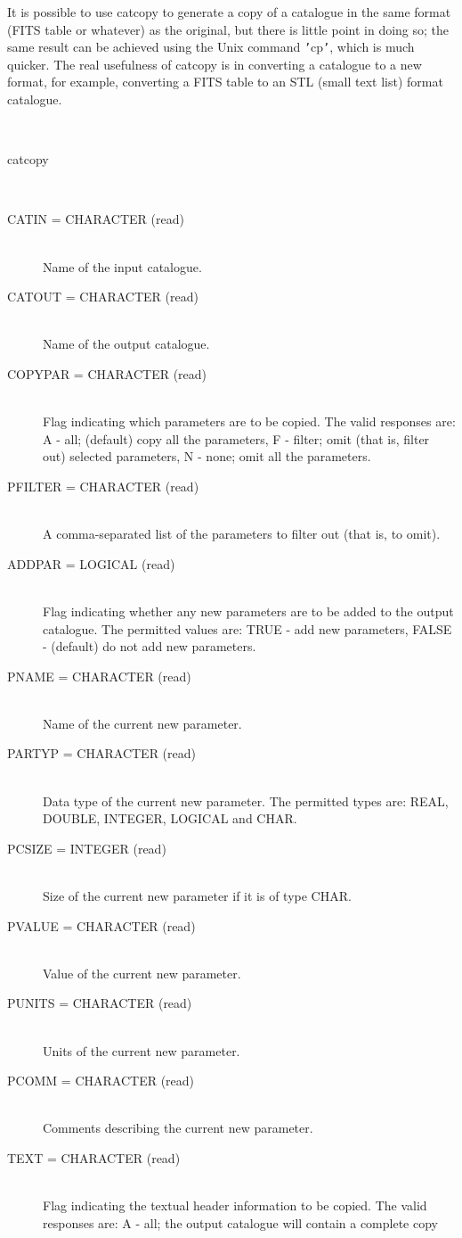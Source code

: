 \documentclass[twoside,11pt]{article}
\renewcommand{\_}{\texttt{\symbol{95}}}
\newcommand{\sstusage}[1]{\item[Usage:] \mbox{}
\\[1.3ex]{\raggedright \ssttt #1}}
\newcommand{\sstparameters}[1]{
   \item[Parameters:] \mbox{} \\
   \vspace{-3.5ex}
   \begin{description}
      #1
   \end{description}
}
\newcommand{\sstsubsection}[1]{ \item[{#1}] \mbox{} \\}
\newcommand{\sstusage}[1]{\item[Usage:]
      \begin{description}
         {\ssttt #1}
      \end{description}
      \\
   }
\newcommand{\sstparameters}[1]{
      \item[Parameters:] \\
      \begin{description}
         #1
      \end{description}
      \\
   }
\newcommand{\sstsubsection}[1]{\item[{#1}]}
\begin{document}
\begin{htmlonly}
{{      It is possible to use catcopy to generate a copy of a catalogue
      in the same format (FITS table or whatever) as the original, but
      there is little point in doing so; the same result can be achieved
      using the Unix command {\tt '}cp{\tt '}, which is much quicker. The real
      usefulness of catcopy is in converting a catalogue to a new format,
      for example, converting a FITS table to an STL (small text list)
      format catalogue.
   }
   \sstusage{
      catcopy
   }
   \sstparameters{
      \sstsubsection{
         CATIN  =  CHARACTER (read)
      }{
         Name of the input catalogue.
      }
      \sstsubsection{
         CATOUT  =  CHARACTER (read)
      }{
         Name of the output catalogue.
      }
      \sstsubsection{
         COPYPAR  =  CHARACTER (read)
      }{
         Flag indicating which parameters are to be copied.
         The valid responses are:
         A - all; (default) copy all the parameters,
         F - filter; omit (that is, filter out) selected parameters,
         N - none; omit all the parameters.
      }
      \sstsubsection{
         PFILTER  =  CHARACTER (read)
      }{
         A comma-separated list of the parameters to filter out (that is,
         to omit).
      }
      \sstsubsection{
         ADDPAR  =  LOGICAL (read)
      }{
         Flag indicating whether any new parameters are to be added to
         the output catalogue.  The permitted values are:
         TRUE  - add new parameters,
         FALSE - (default) do not add new parameters.
      }
      \sstsubsection{
         PNAME  =  CHARACTER (read)
      }{
         Name of the current new parameter.
      }
      \sstsubsection{
         PARTYP  =  CHARACTER (read)
      }{
         Data type of the current new parameter.  The permitted types are:
         REAL, DOUBLE, INTEGER, LOGICAL and CHAR.
      }
      \sstsubsection{
         PCSIZE  =  INTEGER (read)
      }{
         Size of the current new parameter if it is of type CHAR.
      }
      \sstsubsection{
         PVALUE  =  CHARACTER (read)
      }{
         Value of the current new parameter.
      }
      \sstsubsection{
         PUNITS  =  CHARACTER (read)
      }{
         Units of the current new parameter.
      }
      \sstsubsection{
         PCOMM  =  CHARACTER (read)
      }{
         Comments describing the current new parameter.
      }
      \sstsubsection{
         TEXT  =  CHARACTER (read)
      }{
         Flag indicating the textual header information to be copied.
         The valid responses are:
         A - all; the output catalogue will contain a complete copy
}}}
\end{htmlonly}
\end{document}
